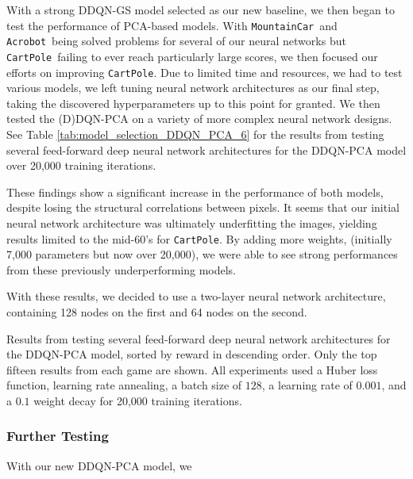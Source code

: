 \documentclass[11pt]{article}
\newcommand{\cp}{\texttt{CartPole}}
\newcommand{\ab}{\texttt{Acrobot}}
\newcommand{\mc}{\texttt{MountainCar}}
\begin{document}
With a strong DDQN-GS model selected as our new baseline, we then began to test the performance of PCA-based models. With \mc~and \ab~being solved problems for several of our neural networks but \cp~failing to ever reach particularly large scores, we then focused our efforts on improving \cp. Due to limited time and resources, we had to test various models, we left tuning neural network architectures as our final step, taking the discovered hyperparameters up to this point for granted. We then tested the (D)DQN-PCA on a variety of more complex neural network designs. See Table \ref{tab:model_selection_DDQN_PCA_6} for the results from testing several feed-forward deep neural network architectures for the DDQN-PCA model over 20,000 training iterations.

These findings show a significant increase in the performance of both models, despite losing the structural correlations between pixels. It seems that our initial neural network architecture was ultimately underfitting the images, yielding results limited to the mid-60's for \cp. By adding more weights, (initially 7,000 parameters but now over 20,000), we were able to see strong performances from these previously underperforming models.

With these results, we decided to use a two-layer neural network architecture, containing 128 nodes on the first and 64 nodes on the second.

\begin{table}[!ht]
    \footnotesize
    \centering
    
    
    \caption{Results from testing several feed-forward deep neural network architectures for the DDQN-PCA model, sorted by reward in descending order. Only the top fifteen results from each game are shown. All experiments used a Huber loss function, learning rate annealing, a batch size of $128$, a learning rate of $0.001$, and a $0.1$ weight decay for 20,000 training iterations.}
    \label{tab:model_selection_DDQN_PCA_6}
\end{table}

\subsubsection{Further Testing}

With our new DDQN-PCA model, we 
\end{document}
